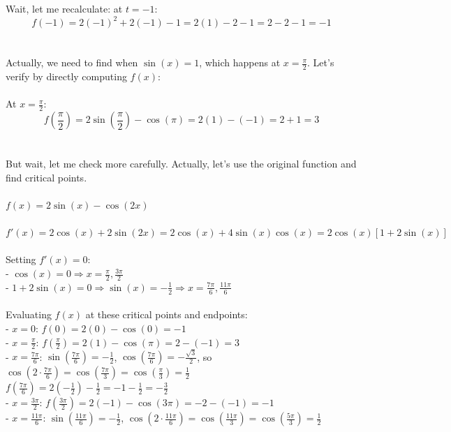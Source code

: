 \documentclass[11pt]{article}
\begin{document}
Wait, let me recalculate: at \(t = -1\):\\
\[f(-1) = 2(-1)^2 + 2(-1) - 1 = 2(1) - 2 - 1 = 2 - 2 - 1 = -1\]\\
\\
Actually, we need to find when \(\sin(x) = 1\), which happens at \(x = \frac{\pi}{2}\). Let's verify by directly computing \(f(x)\):\\
\\
At \(x = \frac{\pi}{2}\):\\
\[f\left(\frac{\pi}{2}\right) = 2\sin\left(\frac{\pi}{2}\right) - \cos(\pi) = 2(1) - (-1) = 2 + 1 = 3\]\\
\\
But wait, let me check more carefully. Actually, let's use the original function and find critical points.\\
\\
\(f(x) = 2\sin(x) - \cos(2x)\)\\
\\
\(f'(x) = 2\cos(x) + 2\sin(2x) = 2\cos(x) + 4\sin(x)\cos(x) = 2\cos(x)[1 + 2\sin(x)]\)\\
\\
Setting \(f'(x) = 0\):\\
- \(\cos(x) = 0 \Rightarrow x = \frac{\pi}{2}, \frac{3\pi}{2}\)\\
- \(1 + 2\sin(x) = 0 \Rightarrow \sin(x) = -\frac{1}{2} \Rightarrow x = \frac{7\pi}{6}, \frac{11\pi}{6}\)\\
\\
Evaluating \(f(x)\) at these critical points and endpoints:\\
- \(x = 0\): \(f(0) = 2(0) - \cos(0) = -1\)\\
- \(x = \frac{\pi}{2}\): \(f\left(\frac{\pi}{2}\right) = 2(1) - \cos(\pi) = 2 - (-1) = 3\)\\
- \(x = \frac{7\pi}{6}\): \(\sin\left(\frac{7\pi}{6}\right) = -\frac{1}{2}\), \(\cos\left(\frac{7\pi}{6}\right) = -\frac{\sqrt{3}}{2}\), so \(\cos\left(2 \cdot \frac{7\pi}{6}\right) = \cos\left(\frac{7\pi}{3}\right) = \cos\left(\frac{\pi}{3}\right) = \frac{1}{2}\)\\
  \(f\left(\frac{7\pi}{6}\right) = 2\left(-\frac{1}{2}\right) - \frac{1}{2} = -1 - \frac{1}{2} = -\frac{3}{2}\)\\
- \(x = \frac{3\pi}{2}\): \(f\left(\frac{3\pi}{2}\right) = 2(-1) - \cos(3\pi) = -2 - (-1) = -1\)\\
- \(x = \frac{11\pi}{6}\): \(\sin\left(\frac{11\pi}{6}\right) = -\frac{1}{2}\), \(\cos\left(2 \cdot \frac{11\pi}{6}\right) = \cos\left(\frac{11\pi}{3}\right) = \cos\left(\frac{5\pi}{3}\right) = \frac{1}{2}\)\\
\end{document}
